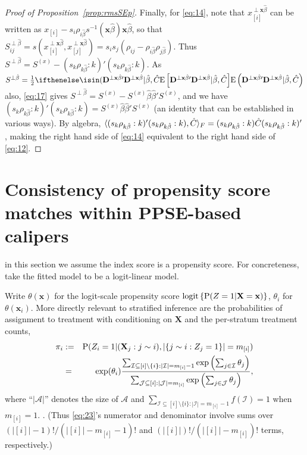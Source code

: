 \documentclass{article}
\theoremstyle{remark}
\begin{document}
\begin{proof}[Proof of Proposition~\ref{prop:rmsSEp}]
Finally, for \eqref{eq:14}, note that $x_{[i]}^{\perp \mathbf{x}\hat\beta}$ can be written as  $x_{[i]} - s_{i}\rho_{i\hat\beta}s^{-1}(\mathbf{x}\hat\beta) \mathbf{x}\hat\beta $, so that  $S^{\perp \hat{\beta}}_{ij} =
 s(x_{[i]}^{\perp \mathbf{x}\hat\beta}, x_{[j]}^{\perp \mathbf{x}\hat\beta}) = s_{i} s_{j} (\rho_{ij} - \rho_{i\hat\beta}\rho_{j\hat\beta})$.  Thus $S^{\perp \hat{\beta}} = S^{(x)} - (s_{k} \rho_{k \hat\beta}: k )' (s_{k} \rho_{k \hat\beta}: k) $.  As $S^{\perp \hat{\beta}} = \frac{1}{2}\E{\mathbf{D}^{\perp \mathbf{x}\hat{\beta}\prime}\mathbf{D}^{\perp \mathbf{x}\hat{\beta}} | \hat\beta, \hat{C}}$ also, \eqref{eq:17} gives $S^{\perp \hat{\beta}} = S^{(x)} - S^{(x)}\hat\beta\hat\beta'S^{(x)} $, and we have $ (s_{k} \rho_{k \hat\beta}: k )' (s_{k} \rho_{k \hat\beta}: k)= S^{(x)}\hat\beta\hat\beta'S^{(x)} $
(an identity that can be established in various ways).  By algebra, $\langle (s_{k} \rho_{k \hat\beta}: k )' (s_{k} \rho_{k \hat\beta}: k), \hat{C}\rangle_{F} = (s_{k} \rho_{k \hat\beta}: k )\hat{C} (s_{k} \rho_{k \hat\beta}: k)'$, making
the right hand side of \eqref{eq:14} equivalent to the right hand side of \eqref{eq:12}.
\end{proof}


\section{Consistency of propensity score matches within PPSE-based calipers}

in this section we assume the index score is a propensity score.  For concreteness,
take the fitted model to be a logit-linear model.

Write $\theta(\mathbf{x})$ for the logit-scale propensity score $\mathrm{logit} \left\{ \operatorname{P} (Z =1 | \mathbf{X} =  \mathbf{x}) \right\}$, $\theta_{i}$ for $\theta(\mathbf{x}_{i})$.  More directly relevant to stratified inference are the probabilities of assignment to treatment with conditioning on $\mathbf{X}$ and the per-stratum treatment counts,
\begin{eqnarray}
\pi_i &:=& 
{\operatorname{P} (Z_{i}=1 | (\mathbf{X}_{j} : j \sim i),  |\{j \sim i: Z_{j}=1\}|=m_{[i]} )  }  
\nonumber\\
& = &  
\exp({\theta_{i}})\frac{ \sum_{\mathcal{I} \subseteq [i]\setminus\{i\}: |\mathcal{I}| =m_{[i]}-1} \exp\left( \sum_{j \in \mathcal{I}} \theta_{j} \right) }{\sum_{\mathcal{J} \subseteq [i]: |\mathcal{J}| =m_{[i]}} \exp \left(\sum_{j \in \mathcal{J} }  \theta_{j} \right) } \label{eq:23},
\end{eqnarray}
where ``$|\mathcal{A}|$'' denotes the size  of $\mathcal{A}$ and $\sum_{\mathcal{I} \subseteq [i]\setminus\{i\}: |\mathcal{I}| =m_{[i]}-1} f(\mathcal{I}) =1$  when $m_{[i]} =1$.%
.  %
(Thus \eqref{eq:23}'s numerator and denominator involve sums over $(|[i]| -1)!/(|[i]| -m_{[i]} -1)!$ and $(|[i]|)!/(|[i]| -m_{[i]})!$ terms, respectively.)
\end{document}

